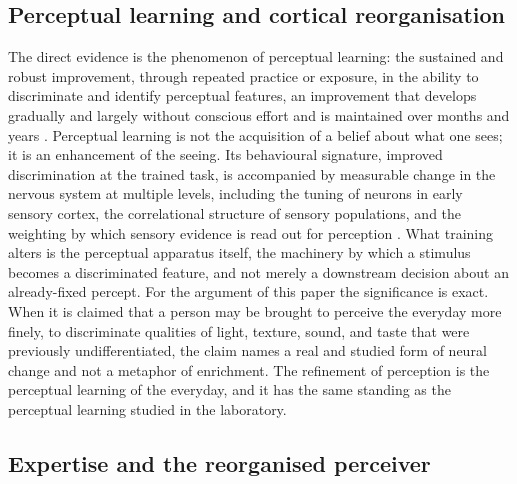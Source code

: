 \subsection{Perceptual learning and cortical reorganisation}
\label{p23:sub:plas-perceptuallearning}

The direct evidence is the phenomenon of perceptual learning: the sustained and robust improvement, through repeated practice or exposure, in the ability to discriminate and identify perceptual features, an improvement that develops gradually and largely without conscious effort and is maintained over months and years \parencite{watanabe2015}. Perceptual learning is not the acquisition of a belief about what one sees; it is an enhancement of the seeing. Its behavioural signature, improved discrimination at the trained task, is accompanied by measurable change in the nervous system at multiple levels, including the tuning of neurons in early sensory cortex, the correlational structure of sensory populations, and the weighting by which sensory evidence is read out for perception \parencite{gilbert2001,watanabe2015}. What training alters is the perceptual apparatus itself, the machinery by which a stimulus becomes a discriminated feature, and not merely a downstream decision about an already-fixed percept. For the argument of this paper the significance is exact. When it is claimed that a person may be brought to perceive the everyday more finely, to discriminate qualities of light, texture, sound, and taste that were previously undifferentiated, the claim names a real and studied form of neural change and not a metaphor of enrichment. The refinement of perception is the perceptual learning of the everyday, and it has the same standing as the perceptual learning studied in the laboratory.

\subsection{Expertise and the reorganised perceiver}
\label{p23:sub:plas-expertise}

